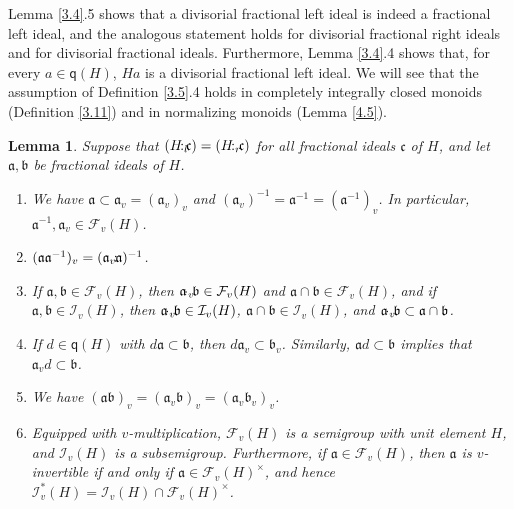 \documentclass[a4paper]{amsart}
\newtheorem{lemma}[theorem]{Lemma}
\theoremstyle{definition}
\numberwithin{equation}{section}
\begin{document}
\smallskip
Lemma \ref{3.4}.5 shows that a divisorial fractional left ideal is
indeed a fractional left ideal, and the analogous statement holds for
divisorial fractional right ideals and for divisorial fractional
ideals. Furthermore, Lemma \ref{3.4}.4 shows that, for every $a \in
\mathsf q (H)$,   $Ha$ is a divisorial fractional left ideal. We
will see that the assumption of Definition \ref{3.5}.4 holds in
completely integrally closed monoids (Definition \ref{3.11}) and in
normalizing monoids (Lemma \ref{4.5}).

\medskip
\begin{lemma} \label{3.6}
Suppose that $(H {\negthinspace :_l \negthinspace} \mathfrak c) = (H {\negthinspace :_r \negthinspace} \mathfrak c)$ for all fractional ideals $\mathfrak c$
of $H$,  and let $\mathfrak a, \mathfrak b$ be fractional ideals of $H$.

\begin{enumerate}
\smallskip
\item We have $\mathfrak a \subset \mathfrak a_v = (\mathfrak a_v)_v$ and $(\mathfrak a_v)^{-1} = \mathfrak a^{-1} = (\mathfrak a^{-1})_v$.
      In particular,  $\mathfrak a^{-1}, \mathfrak a_v \in \mathcal F_v (H)$.

\smallskip
\item $( \mathfrak a \mathfrak a^{-1})_v =
(\mathfrak a_v {\negthinspace : \negthinspace} \mathfrak a)^{-1}$.

\smallskip
\item If $\mathfrak a, \mathfrak b \in \mathcal F_v (H)$, then $\mathfrak a {\negthinspace \cdot_v \negthinspace} \mathfrak b \in \mathcal F_v (H)$ and $\mathfrak a \cap \mathfrak b \in \mathcal F_v (H)$, and if $\mathfrak a, \mathfrak b \in \mathcal I_v (H)$, then $\mathfrak a {\negthinspace \cdot_v \negthinspace} \mathfrak b \in \mathcal I_v (H)$, $\mathfrak a \cap \mathfrak b \in \mathcal I_v (H)$, and $\mathfrak a {\negthinspace \cdot_v \negthinspace} \mathfrak b \subset \mathfrak a \cap \mathfrak b$.

\smallskip
\item If $d \in \mathsf q (H)$ with $d \mathfrak a \subset \mathfrak
      b$, then $d \mathfrak a_v \subset \mathfrak b_v$. Similarly,
      $\mathfrak a d \subset \mathfrak b$ implies that $\mathfrak a_v d \subset \mathfrak
      b$.

\smallskip
\item We have $(\mathfrak a \mathfrak b)_v = (\mathfrak a_v
      \mathfrak b)_v = (\mathfrak a_v \mathfrak b_v)_v$.

\smallskip
\item Equipped with $v$-multiplication, $\mathcal F_v (H)$ is a semigroup with unit element $H$, and $\mathcal I_v (H)$ is a subsemigroup.
      Furthermore, if $\mathfrak a \in \mathcal F_v (H)$, then $\mathfrak a$ is $v$-invertible if and only if $\mathfrak a \in \mathcal F_v
      (H)^{\times}$, and hence $\mathcal I_v^* (H) = \mathcal I_v
      (H) \cap \mathcal F_v (H)^{\times}$.
\end{enumerate}
\end{lemma}
\end{document}
